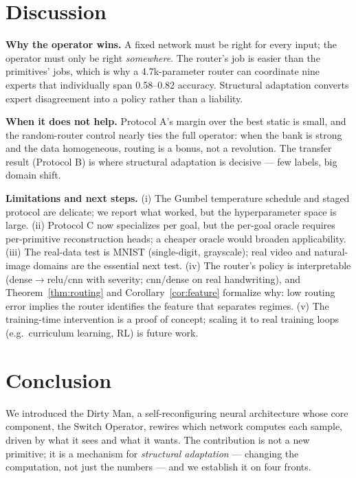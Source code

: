 \documentclass[11pt,a4paper]{article}
\begin{document}
\section{Discussion}
\label{sec:discussion}

\textbf{Why the operator wins.} A fixed network must be right for every input; the operator must only be right \emph{somewhere}. The router's job is easier than the primitives' jobs, which is why a 4.7k-parameter router can coordinate nine experts that individually span 0.58--0.82 accuracy. Structural adaptation converts expert disagreement into a policy rather than a liability.

\textbf{When it does not help.} Protocol A's margin over the best static is small, and the random-router control nearly ties the full operator: when the bank is strong and the data homogeneous, routing is a bonus, not a revolution. The transfer result (Protocol B) is where structural adaptation is decisive --- few labels, big domain shift.

\textbf{Limitations and next steps.} (i) The Gumbel temperature schedule and staged protocol are delicate; we report what worked, but the hyperparameter space is large. (ii) Protocol C now specializes per goal, but the per-goal oracle requires per-primitive reconstruction heads; a cheaper oracle would broaden applicability. (iii) The real-data test is MNIST (single-digit, grayscale); real video and natural-image domains are the essential next test. (iv) The router's policy is interpretable (dense$\to$relu/cnn with severity; cnn/dense on real handwriting), and Theorem~\ref{thm:routing} and Corollary~\ref{cor:feature} formalize why: low routing error implies the router identifies the feature that separates regimes. (v) The training-time intervention is a proof of concept; scaling it to real training loops (e.g.\ curriculum learning, RL) is future work.

\section{Conclusion}
\label{sec:conclusion}

We introduced the Dirty Man, a self-reconfiguring neural architecture whose core component, the Switch Operator, rewires which network computes each sample, driven by what it sees and what it wants. The contribution is not a new primitive; it is a mechanism for \emph{structural adaptation} --- changing the computation, not just the numbers --- and we establish it on four fronts.
\end{document}
